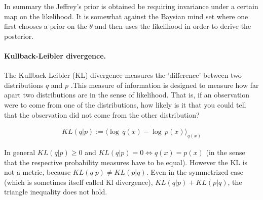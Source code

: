 In summary the Jeffrey's prior is obtained be requiring invariance under a certain map on the likelihood. It is somewhat against the Baysian mind set where one first chooses a prior on the $\theta$ and then uses the likelihood in order to derive the posterior.

\paragraph{Kullback-Leibler divergence.} The Kullback-Leibler (KL) divergence measures the 'difference' between two distributions $q$ and $p$ \cite{barber}.This measure of information is designed to measure
how far apart two distributions are in the sense of likelihood. That is, if
an observation were to come from one of the distributions, how likely is
it that you could tell that the observation did not come from the other
distribution? \cite{schervish}
\begin{definition}
\begin{align}
KL(q|p) := \langle \log \,q(x) - \log \,p (x)\rangle_{q(x)}  
\end{align}
\end{definition}
In general $KL(q|p) \geq 0$ and $KL(q|p) = 0   \Leftrightarrow q(x) = p(x)$ (in the sense that the respective probability measures have to be equal). However the KL is not a metric, because $KL(q|p) \neq KL(p|q)$. Even in the symmetrized case (which is sometimes itself called Kl divergence),  $KL(q|p) + KL(p|q)$, the triangle inequality does not hold. 
